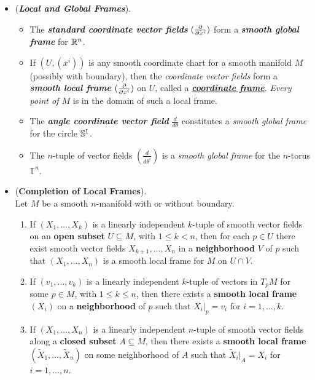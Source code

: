 \documentclass[11pt]{article}
\begin{document}
\begin{itemize}
\item 
\begin{example} (\emph{\textbf{Local and Global Frames}}).
\begin{itemize}
\item The \emph{\textbf{standard coordinate vector fields}} $(\frac{\partial }{ \partial x^{i}})$ form a \textbf{\emph{smooth global frame}} for ${\mathbb R}^n$.
\item If $(U, (x^i))$ is any smooth coordinate chart for a smooth manifold $M$ (possibly with boundary), then the \emph{coordinate vector fields} form a \emph{\textbf{smooth local frame}} $(\frac{\partial }{ \partial x^{i}})$ on $U$, called a \underline{\emph{\textbf{coordinate frame}}}. \emph{Every point of $M$} is in the domain of such a local frame.
\item The \emph{\textbf{angle coordinate vector field}} $\frac{d}{d\theta}$ constitutes a \emph{smooth global frame} for the circle ${\mathbb S}^1$.
\item The $n$-tuple of vector fields $(\frac{d}{d\theta^{i}})$ is a \emph{smooth global frame} for the $n$-torus $\mathbb{T}^{n}$.
\end{itemize}
\end{example}

\item \begin{proposition} (\textbf{Completion of Local Frames}).\\
Let $M$ be a smooth $n$-manifold with or without boundary.
\begin{enumerate}
\item If $(X_1,\ldots,X_k)$ is a linearly independent $k$-tuple of smooth vector fields on an \textbf{open subset} $U \subseteq M$, with $1 \le k < n$, then for each $p \in U$ there exist smooth vector fields $X_{k+1},\ldots,X_{n}$ in a \textbf{neighborhood} $V$ of $p$ such that $(X_1,\ldots,X_n)$ is a smooth local frame for $M$ on $U \cap V$.
\item If $(v_1, \ldots, v_k)$ is a linearly independent $k$-tuple of vectors in $T_{p}M$ for some $p \in M$, with $1 \le k \le n$, then there exists a \textbf{smooth local frame} $(X_i)$ on a \textbf{neighborhood} of $p$ such that $X_i|_{p}  = v_i$ for $i = 1,\ldots,k$.
\item If $(X_1,\ldots,X_n)$ is a linearly independent $n$-tuple of smooth vector fields along a \textbf{closed subset} $A \subseteq M$, then there exists a \textbf{smooth local frame} $(\widetilde{X}_1,\ldots, \widetilde{X}_n)$ on some neighborhood of $A$ such that $\widetilde{X}_i|_{A}  = X_i$ for $i = 1,\ldots,n$.
\end{enumerate}
\end{proposition}


\end{itemize}
\end{document}

